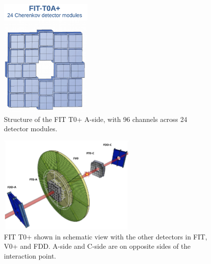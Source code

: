 \begin{figure}[H]
    \centering
    \includegraphics[width=0.4\textwidth]{figures/FIT/FT0A_Structure.png}
    \caption{Structure of the FIT T0+ A-side, with 96 channels across 24 detector modules. \cite{Slupecki}}
    \label{fig:my_label}
\end{figure}

\begin{figure}[H]
    \centering
    \includegraphics[width=0.6\textwidth]{figures/FIT/FIT_Layout.png}
    \caption{FIT T0+ shown in schematic view with the other detectors in FIT, V0+ and FDD. A-side and C-side are on opposite sides of the interaction point. \cite{Contreras}}
    \label{fig:FIT_Layout}
\end{figure}



